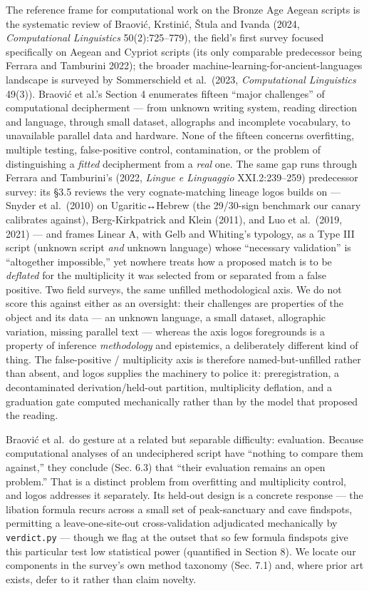 \documentclass[
  10pt,
]{article}
\begin{document}
The reference frame for computational work on the Bronze Age Aegean
scripts is the systematic review of Braović, Krstinić, Štula and Ivanda
(2024, \emph{Computational Linguistics} 50(2):725--779), the field's
first survey focused specifically on Aegean and Cypriot scripts (its
only comparable predecessor being Ferrara and Tamburini 2022); the
broader machine-learning-for-ancient-languages landscape is surveyed by
Sommerschield et al.~(2023, \emph{Computational Linguistics} 49(3)).
Braović et al.'s Section 4 enumerates fifteen ``major challenges'' of
computational decipherment --- from unknown writing system, reading
direction and language, through small dataset, allographs and incomplete
vocabulary, to unavailable parallel data and hardware. None of the
fifteen concerns overfitting, multiple testing, false-positive control,
contamination, or the problem of distinguishing a \emph{fitted}
decipherment from a \emph{real} one. The same gap runs through Ferrara
and Tamburini's (2022, \emph{Lingue e Linguaggio} XXI.2:239--259)
predecessor survey: its §3.5 reviews the very cognate-matching lineage
logos builds on --- Snyder et al.~(2010) on Ugaritic↔Hebrew (the
29/30-sign benchmark our canary calibrates against), Berg-Kirkpatrick
and Klein (2011), and Luo et al.~(2019, 2021) --- and frames Linear A,
with Gelb and Whiting's typology, as a Type III script (unknown script
\emph{and} unknown language) whose ``necessary validation'' is
``altogether impossible,'' yet nowhere treats how a proposed match is to
be \emph{deflated} for the multiplicity it was selected from or
separated from a false positive. Two field surveys, the same unfilled
methodological axis. We do not score this against either as an
oversight: their challenges are properties of the object and its data
--- an unknown language, a small dataset, allographic variation, missing
parallel text --- whereas the axis logos foregrounds is a property of
inference \emph{methodology} and epistemics, a deliberately different
kind of thing. The false-positive / multiplicity axis is therefore
named-but-unfilled rather than absent, and logos supplies the machinery
to police it: preregistration, a decontaminated derivation/held-out
partition, multiplicity deflation, and a graduation gate computed
mechanically rather than by the model that proposed the reading.

Braović et al.~do gesture at a related but separable difficulty:
evaluation. Because computational analyses of an undeciphered script
have ``nothing to compare them against,'' they conclude (Sec. 6.3) that
``their evaluation remains an open problem.'' That is a distinct problem
from overfitting and multiplicity control, and logos addresses it
separately. Its held-out design is a concrete response --- the libation
formula recurs across a small set of peak-sanctuary and cave findspots,
permitting a leave-one-site-out cross-validation adjudicated
mechanically by \texttt{verdict.py} --- though we flag at the outset
that so few formula findspots give this particular test low statistical
power (quantified in Section 8). We locate our components in the
survey's own method taxonomy (Sec. 7.1) and, where prior art exists,
defer to it rather than claim novelty.
\end{document}
